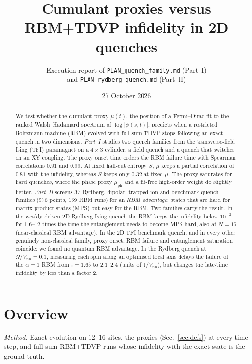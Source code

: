 \documentclass[11pt,a4paper]{article}
\title{Cumulant proxies versus RBM+TDVP infidelity in 2D quenches}
\author{Execution report of \texttt{PLAN\_quench\_family.md} (Part~I)\\ and \texttt{PLAN\_rydberg\_quench.md} (Part~II)}
\date{27 October 2026}
\begin{document}
\maketitle

\begin{abstract}
We test whether the cumulant proxy $\mu(t)$, the position of a Fermi--Dirac fit to the ranked Walsh--Hadamard
spectrum of $\log|\psi(s,t)|$, predicts when a restricted Boltzmann machine (RBM) evolved with full-sum TDVP stops
following an exact quench in two dimensions.
\emph{Part~I} studies two quench families from the transverse-field Ising (TFI) paramagnet on a $4\times3$ cylinder:
a field quench and a quench that switches on an XY coupling.
The proxy onset time orders the RBM failure time with Spearman correlations $0.91$ and $0.99$. At fixed half-cut
entropy $S$, $\mu$ keeps a partial correlation of $0.81$ with the infidelity, whereas $S$ keeps only $0.32$ at fixed
$\mu$. The proxy saturates for hard quenches, where the phase proxy $\mu_{\mathrm{ph}}$ and a fit-free high-order
weight do slightly better.
\emph{Part~II} screens 37 Rydberg, dipolar, trapped-ion and benchmark quench families (976 points, 159 RBM runs) for
an \emph{RBM advantage}: states that are hard for matrix product states (MPS) but easy for the RBM. Two families carry
the result. In the weakly driven 2D Rydberg Ising quench the RBM keeps the infidelity below $10^{-3}$ for $1.6$--$12$
times the time the entanglement needs to become MPS-hard, also at $N=16$ (near-classical RBM advantage). In the 2D TFI
benchmark quench, and in every other genuinely non-classical family, proxy onset, RBM failure and entanglement
saturation coincide: we found no quantum RBM advantage. In the Rydberg quench at $\Omega/V_{nn}=0.1$, measuring each spin
along an optimised local axis delays the failure of the $\alpha=1$ RBM from $t=1.65$ to $2.1$--$2.4$ (units of
$1/V_{nn}$), but changes the late-time infidelity by less than a factor $2$.
\end{abstract}

\section{Overview}
\emph{Method.} Exact evolution on 12--16 sites, the proxies (Sec.~\ref{sec:defs}) at every time step, and full-sum
RBM+TDVP runs whose infidelity with the exact state is the ground truth.
\end{document}
